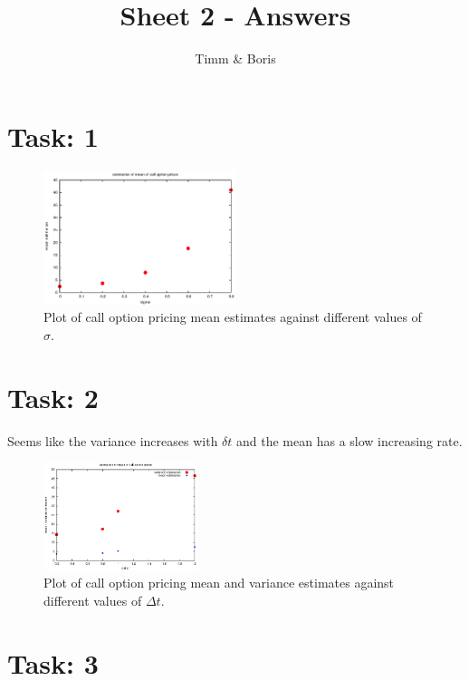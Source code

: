 \documentclass{article}
\title{Sheet 2 - Answers}
\author{Timm \& Boris}
\begin{document}
\maketitle

\section*{Task: 1}

\begin{figure}[htbp]
  \centering
    \includegraphics[width=0.50\textwidth]{../Task01/sh2_task1_mean_estimates_plot.eps}
			\caption{Plot of call option pricing mean estimates against different values of $\sigma$.}
\end{figure}

\section*{Task: 2}
Seems like the variance increases with $\delta t$ and the mean has a slow increasing rate.

\begin{figure}[htbp]
  \centering
     \includegraphics[width=0.40\textwidth]{../Task02/sh2_task2_variance_estimates_plot.eps}
   \caption{Plot of call option pricing mean and variance estimates against different values of $\Delta t$.}
\end{figure}

\section*{Task: 3}
\end{document}
